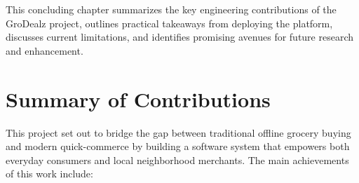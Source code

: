 
This concluding chapter summarizes the key engineering contributions of the GroDealz project, outlines practical takeaways from deploying the platform, discusses current limitations, and identifies promising avenues for future research and enhancement.

\section{Summary of Contributions}

This project set out to bridge the gap between traditional offline grocery buying and modern quick-commerce by building a software system that empowers both everyday consumers and local neighborhood merchants. The main achievements of this work include:

